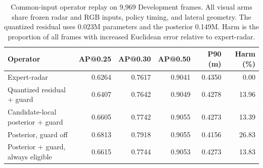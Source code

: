 \begin{table}[t]
\centering\small
\caption{Common-input operator replay on 9,969 Development frames. All visual arms share frozen radar and RGB inputs, policy timing, and lateral geometry. The quantized residual uses 0.023M parameters and the posterior 0.149M. Harm is the proportion of all frames with increased Euclidean error relative to expert-radar.}
\label{tab:operator-study}
\begin{tabular*}{\textwidth}{@{\extracolsep{\fill}}lrrrrr@{}}
\toprule
Operator & AP@0.25 & AP@0.30 & AP@0.50 & P90 (m) & Harm (\%)\\
\midrule
Expert-radar &0.6264&0.7617&0.9041&0.4350&0.00\\
Quantized residual + guard &0.6407&0.7642&0.9049&0.4278&13.96\\
Candidate-local posterior + guard &0.6605&0.7742&0.9055&0.4273&13.39\\
\midrule
Posterior, guard off &0.6813&0.7918&0.9055&0.4156&26.83\\
Posterior + guard, always eligible &0.6615&0.7744&0.9053&0.4273&13.83\\
\bottomrule
\end{tabular*}
\end{table}
